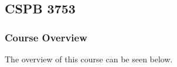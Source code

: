 \clearpage

\renewcommand{\ChapTitle}{\CSPBOS}
\renewcommand{\SectionTitle}{CSPB 3753}

\chapter{\ChapTitle}
\section{\SectionTitle}

\subsection{Course Overview}

The overview of this course can be seen below.

